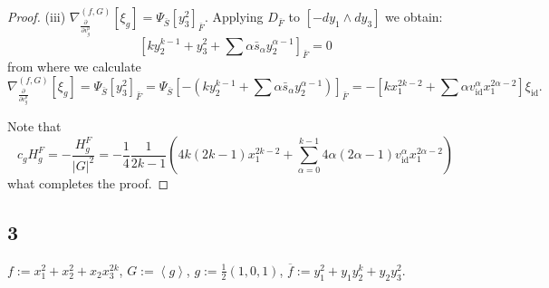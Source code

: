 \documentclass[reqno,12pt]{amsart}
\numberwithin{equation}{section}
\theoremstyle{plain}
\theoremstyle{definition}
\newcommand{\CC}{{\mathbb{C}}}
\newcommand{\Jac}{\mathrm{Jac}}
\newcommand{\id}{\mathrm{id}}
\def\T{{\mathcal T}}
\numberwithin{equation}{section}
\begin{document}
\begin{proof}
(iii) $\nabla_{\frac{\partial}{\partial v^0_{g}}}^{(f,G)}[\xi_{g}] = \Psi_{\bar{S}}[y_3^2]_{\bar{F}}$. Applying $D_{\bar{F}}$ to $[-dy_1\wedge dy_3]$ we obtain:
\[
[ky_2^{k-1} + y_3^2 + \sum \alpha \bar{s}_{\alpha} y_2^{\alpha-1}]_{\bar{F}} = 0
\]
from where we calculate
\[
\nabla_{\frac{\partial}{\partial v^0_{g}}}^{(f,G)}[\xi_{g}] = \Psi_{\bar{S}}[y_3^2]_{\bar{F}} 
= \Psi_{\bar{S}}[ -(ky_2^{k-1} + \sum \alpha \bar{s}_{\alpha} y_2^{\alpha-1})]_{\bar{F}} 
= -[kx_1^{2k-2} + \sum \alpha v^{\alpha}_{\id} x_1^{2\alpha-2}]\xi_{\id}.
\]

Note that
\[
    c_gH^F_g = -\frac{H^F_g}{|G|^2} = -\frac{1}{4}\frac{1}{2k-1}(4k(2k-1)x_1^{2k-2} +  \sum^{k-1}_{\alpha = 0} 4\alpha(2\alpha-1)v_{\id}^{\alpha} x_1^{2\alpha-2}) 
\]
what completes the proof.
\end{proof}



\subsection*{3} 
$f:=x_1^{2}+x_2^2+x_2x_3^{2k}$, $G:=\left<g\right>$, $g:=\frac{1}{2}(1,0,1)$,  $\overline{f}:=y_1^2+y_1y_2^k+y_2y_3^2$.

\end{document}
